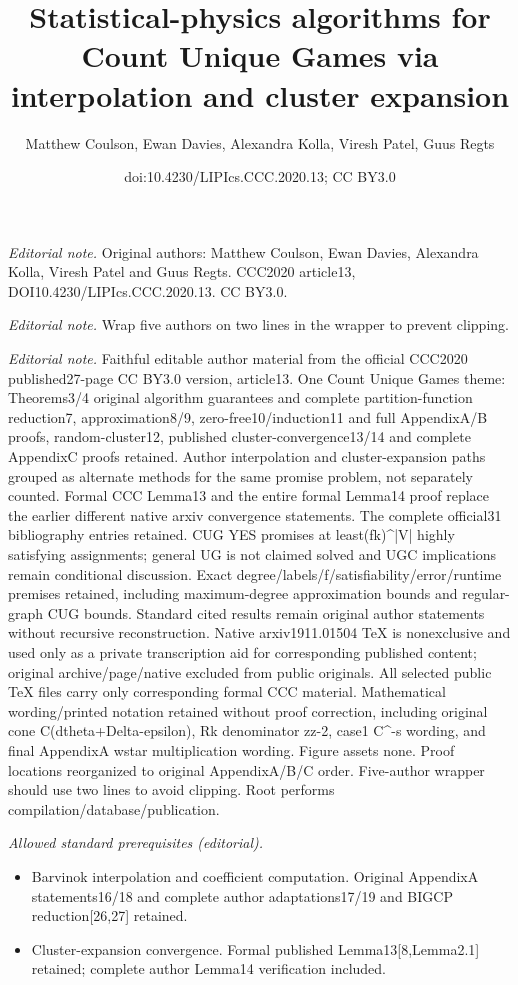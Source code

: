 \documentclass[10pt,a4paper]{article}
\title{Statistical-physics algorithms for Count Unique Games via interpolation and cluster expansion}
\author{Matthew Coulson, Ewan Davies, Alexandra Kolla, Viresh Patel, Guus Regts}
\date{doi:10.4230/LIPIcs.CCC.2020.13; CC BY3.0}
\theoremstyle{definition}
\begin{document}
\maketitle
\noindent\textit{Editorial note.} Original authors: Matthew Coulson, Ewan Davies, Alexandra Kolla, Viresh Patel and Guus Regts. CCC2020 article13, DOI10.4230/LIPIcs.CCC.2020.13. CC BY3.0.\par\medskip
\noindent\textit{Editorial note.} Wrap five authors on two lines in the wrapper to prevent clipping.\par\medskip
\noindent\textit{Editorial note.} Faithful editable author material from the official CCC2020 published27-page CC BY3.0 version, article13. One Count Unique Games theme: Theorems3/4 original algorithm guarantees and complete partition-function reduction7, approximation8/9, zero-free10/induction11 and full AppendixA/B proofs, random-cluster12, published cluster-convergence13/14 and complete AppendixC proofs retained. Author interpolation and cluster-expansion paths grouped as alternate methods for the same promise problem, not separately counted. Formal CCC Lemma13 and the entire formal Lemma14 proof replace the earlier different native arxiv convergence statements. The complete official31 bibliography entries retained. CUG YES promises at least(fk)\textasciicircum{}|V| highly satisfying assignments; general UG is not claimed solved and UGC implications remain conditional discussion. Exact degree/labels/f/satisfiability/error/runtime premises retained, including maximum-degree approximation bounds and regular-graph CUG bounds. Standard cited results remain original author statements without recursive reconstruction. Native arxiv1911.01504 TeX is nonexclusive and used only as a private transcription aid for corresponding published content; original archive/page/native excluded from public originals. All selected public TeX files carry only corresponding formal CCC material. Mathematical wording/printed notation retained without proof correction, including original cone C(dtheta+Delta-epsilon), Rk denominator zz-2, case1 C\textasciicircum{}-s wording, and final AppendixA wstar multiplication wording. Figure assets none. Proof locations reorganized to original AppendixA/B/C order. Five-author wrapper should use two lines to avoid clipping. Root performs compilation/database/publication.\par\medskip
\noindent\textit{Allowed standard prerequisites (editorial).}\begin{itemize}
\item Barvinok interpolation and coefficient computation. Original AppendixA statements16/18 and complete author adaptations17/19 and BIGCP reduction[26,27] retained.
\item Cluster-expansion convergence. Formal published Lemma13[8,Lemma2.1] retained; complete author Lemma14 verification included.
\end{itemize}\medskip
\end{document}
